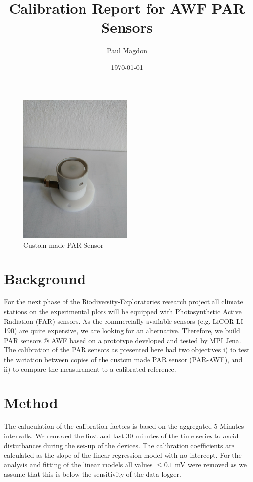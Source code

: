 \documentclass[oneside]{report}
\title{Calibration Report for AWF PAR Sensors}
\author{Paul Magdon}
\date{\today}
\begin{document}
\maketitle

\begin{figure}[H]
  \centering
  \includegraphics[width=0.5\textwidth,angle=-90]{graphs/sensor.jpg}
	\caption{Custom made PAR Sensor}
\end{figure}

\section*{Background}
For the next phase of the Biodiversity-Exploratories research project all climate stations on the experimental  plots will be equipped with Photosynthetic Active Radiation (PAR) sensors. As the commercially available sensors (e.g. LiCOR LI-190) are quite expensive, we are looking for an alternative. Therefore, we build PAR sensors @ AWF based on a prototype developed and tested by MPI Jena. The calibration of the PAR sensors as presented here had two objectives i) to test the variation between copies of the custom made PAR sensor (PAR-AWF), and ii) to compare the measurement to a calibrated reference.

\section*{Method}
The caluculation of the calibration factors is based on the aggregated 5 Minutes intervalls. We removed the first and last 30 minutes of the time series to avoid disturbances during the set-up of the devices. The calibration coefficients are calculated as the slope of the linear regression model with no intercept. For the analysis and fitting of the linear models all values $\le0.1$ mV were removed as we assume that this is below the sensitivity of the data logger.
\end{document}

